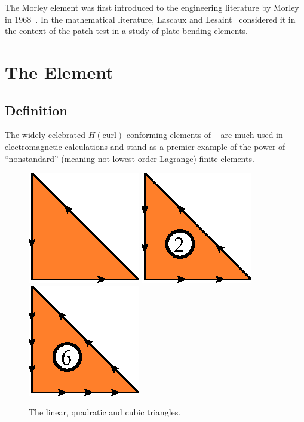 The Morley element was first introduced to the engineering literature
by Morley in 1968~\cite{Morley1968}. In the mathematical literature,
Lascaux and Lesaint~\cite{LascauxLesaint1975} considered it in the
context of the patch test in a study of plate-bending elements.


\newpage

\section{The \nedelec{} Element}

\subsection{Definition}

The widely celebrated \( H(\mathrm{curl}) \)-conforming elements of
\nedelec{}~\cite{Nedelec1980,Nedelec1986} are much used in electromagnetic
calculations and stand as a premier example of the power of
``nonstandard'' (meaning not lowest-order Lagrange) finite elements.

\begin{figure}[H]
  \begin{center}
    \includegraphics[width=\smallwidth]{chapters/kirby-6/eps/NED1.eps}
    \includegraphics[width=\smallwidth]{chapters/kirby-6/eps/NED2.eps}
    \includegraphics[width=\smallwidth]{chapters/kirby-6/eps/NED3.eps}
    \caption{The linear, quadratic and cubic \nedelec{} triangles.}
  \end{center}
\end{figure}


